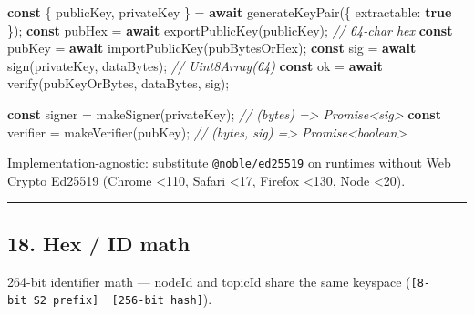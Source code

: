 \documentclass[
  nobib]{tufte-handout}
\newenvironment{Shaded}{}{}
\newcommand{\CommentTok}[1]{\textcolor[rgb]{0.38,0.63,0.69}{\textit{#1}}}
\newcommand{\ControlFlowTok}[1]{\textcolor[rgb]{0.00,0.44,0.13}{\textbf{#1}}}
\newcommand{\DataTypeTok}[1]{\textcolor[rgb]{0.56,0.13,0.00}{#1}}
\newcommand{\FunctionTok}[1]{\textcolor[rgb]{0.02,0.16,0.49}{#1}}
\newcommand{\KeywordTok}[1]{\textcolor[rgb]{0.00,0.44,0.13}{\textbf{#1}}}
\newcommand{\NormalTok}[1]{#1}
\newcommand{\OperatorTok}[1]{\textcolor[rgb]{0.40,0.40,0.40}{#1}}
\begin{document}
\begin{Shaded}
\begin{Highlighting}[]
\KeywordTok{const}\NormalTok{ \{ publicKey}\OperatorTok{,}\NormalTok{ privateKey \} }\OperatorTok{=} \ControlFlowTok{await} \FunctionTok{generateKeyPair}\NormalTok{(\{ }\DataTypeTok{extractable}\OperatorTok{:} \KeywordTok{true}\NormalTok{ \})}\OperatorTok{;}
\KeywordTok{const}\NormalTok{ pubHex  }\OperatorTok{=} \ControlFlowTok{await} \FunctionTok{exportPublicKey}\NormalTok{(publicKey)}\OperatorTok{;}   \CommentTok{// 64{-}char hex}
\KeywordTok{const}\NormalTok{ pubKey  }\OperatorTok{=} \ControlFlowTok{await} \FunctionTok{importPublicKey}\NormalTok{(pubBytesOrHex)}\OperatorTok{;}
\KeywordTok{const}\NormalTok{ sig     }\OperatorTok{=} \ControlFlowTok{await} \FunctionTok{sign}\NormalTok{(privateKey}\OperatorTok{,}\NormalTok{ dataBytes)}\OperatorTok{;}  \CommentTok{// Uint8Array(64)}
\KeywordTok{const}\NormalTok{ ok      }\OperatorTok{=} \ControlFlowTok{await} \FunctionTok{verify}\NormalTok{(pubKeyOrBytes}\OperatorTok{,}\NormalTok{ dataBytes}\OperatorTok{,}\NormalTok{ sig)}\OperatorTok{;}

\KeywordTok{const}\NormalTok{ signer   }\OperatorTok{=} \FunctionTok{makeSigner}\NormalTok{(privateKey)}\OperatorTok{;}   \CommentTok{// (bytes) =\textgreater{} Promise\textless{}sig\textgreater{}}
\KeywordTok{const}\NormalTok{ verifier }\OperatorTok{=} \FunctionTok{makeVerifier}\NormalTok{(pubKey)}\OperatorTok{;}      \CommentTok{// (bytes, sig) =\textgreater{} Promise\textless{}boolean\textgreater{}}
\end{Highlighting}
\end{Shaded}

Implementation-agnostic: substitute \texttt{@noble/ed25519} on runtimes
without Web Crypto Ed25519 (Chrome \textless110, Safari \textless17,
Firefox \textless130, Node \textless20).

\begin{center}\rule{0.5\linewidth}{0.5pt}\end{center}

\subsection{18. Hex / ID math}\label{hex-id-math}

264-bit identifier math --- nodeId and topicId share the same keyspace
(\texttt{{[}8-bit\ S2\ prefix{]}\ \textbar{}\textbar{}\ {[}256-bit\ hash{]}}).
\end{document}
